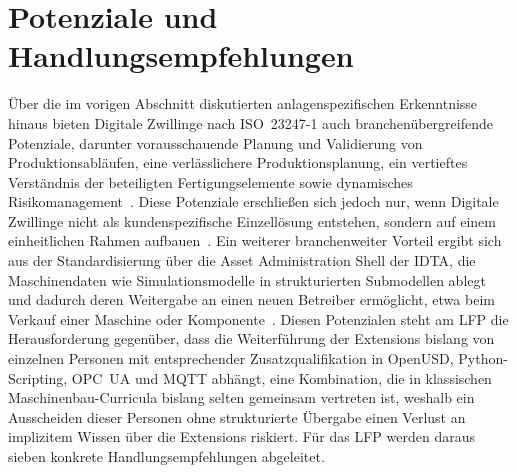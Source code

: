 \documentclass[conference]{IEEEtran}
\begin{document}
\section{Potenziale und Handlungsempfehlungen}
Über die im vorigen Abschnitt diskutierten anlagenspezifischen Erkenntnisse hinaus bieten Digitale Zwillinge nach ISO~23247-1 auch branchenübergreifende Potenziale, darunter vorausschauende Planung und Validierung von Produktionsabläufen, eine verlässlichere Produktionsplanung, ein vertieftes Verständnis der beteiligten Fertigungselemente sowie dynamisches Risikomanagement~\cite{iso23247}.
Diese Potenziale erschließen sich jedoch nur, wenn Digitale Zwillinge nicht als kundenspezifische Einzellösung entstehen, sondern auf einem einheitlichen Rahmen aufbauen~\cite{shao2023standardized}.
Ein weiterer branchenweiter Vorteil ergibt sich aus der Standardisierung über die Asset Administration Shell der IDTA, die Maschinendaten wie Simulationsmodelle in strukturierten Submodellen ablegt und dadurch deren Weitergabe an einen neuen Betreiber ermöglicht, etwa beim Verkauf einer Maschine oder Komponente~\cite{zhang2025aas}.
Diesen Potenzialen steht am LFP die Herausforderung gegenüber, dass die Weiterführung der Extensions bislang von einzelnen Personen mit entsprechender Zusatzqualifikation in OpenUSD, Python-Scripting, OPC~UA und MQTT abhängt, eine Kombination, die in klassischen Maschinenbau-Curricula bislang selten gemeinsam vertreten ist, weshalb ein Ausscheiden dieser Personen ohne strukturierte Übergabe einen Verlust an implizitem Wissen über die Extensions riskiert.
Für das LFP werden daraus sieben konkrete Handlungsempfehlungen abgeleitet.
\end{document}
